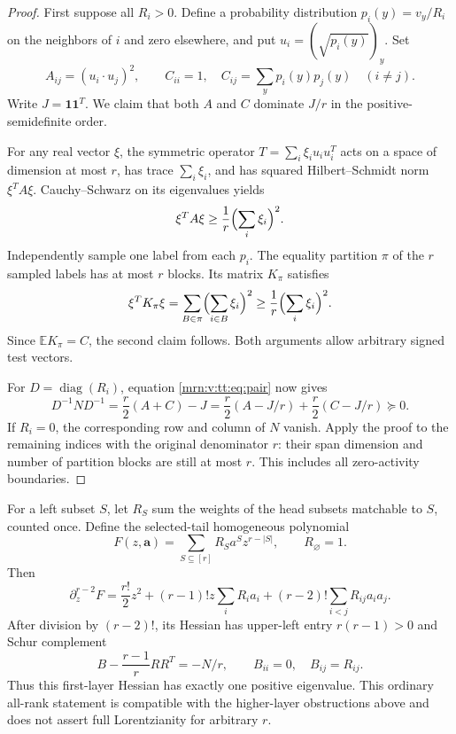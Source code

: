 \documentclass[11pt,a4paper]{article}
\theoremstyle{remark}\newtheorem{remark}[theorem]{Remark}
\newcommand{\diag}{\operatorname{diag}}    %
\begin{document}
\begin{proof}
First suppose all $R_i>0$. Define a probability distribution $p_i(y)=v_y/R_i$ on the neighbors of $i$ and zero elsewhere, and put $u_i=(\sqrt{p_i(y)})_y$. Set
\[
 A_{ij}=(u_i\cdot u_j)^2,\qquad
 C_{ii}=1,\quad C_{ij}=\sum_y p_i(y)p_j(y)\quad(i\ne j).
\]
Write $J=\mathbf1\mathbf1^T$. We claim that both $A$ and $C$ dominate $J/r$ in the positive-semidefinite order.

For any real vector $\xi$, the symmetric operator $T=\sum_i\xi_i u_i u_i^T$ acts on a space of dimension at most $r$, has trace $\sum_i\xi_i$, and has squared Hilbert--Schmidt norm $\xi^TA\xi$. Cauchy--Schwarz on its eigenvalues yields
\[
 \xi^TA\xi\ge\frac1r\Bigl(\sum_i\xi_i\Bigr)^2.
\]
Independently sample one label from each $p_i$. The equality partition $\pi$ of the $r$ sampled labels has at most $r$ blocks. Its matrix $K_\pi$ satisfies
\[
 \xi^TK_\pi\xi=\sum_{B\in\pi}\Bigl(\sum_{i\in B}\xi_i\Bigr)^2
       \ge\frac1r\Bigl(\sum_i\xi_i\Bigr)^2.
\]
Since $\mathbb E K_\pi=C$, the second claim follows. Both arguments allow arbitrary signed test vectors.

For $D=\diag(R_i)$, equation \eqref{mrn:v:tt:eq:pair} now gives
\begin{equation}\label{mrn:v:tt:eq:gram}
 D^{-1}ND^{-1}=\frac r2(A+C)-J
 =\frac r2(A-J/r)+\frac r2(C-J/r)\succeq0.
\end{equation}
If $R_i=0$, the corresponding row and column of $N$ vanish. Apply the proof to the remaining indices with the original denominator $r$: their span dimension and number of partition blocks are still at most $r$. This includes all zero-activity boundaries.
\end{proof}

For a left subset $S$, let $R_S$ sum the weights of the head subsets matchable to $S$, counted once. Define the selected-tail homogeneous polynomial
\[
 F(z,\mathbf a)=\sum_{S\subseteq[r]}R_Sa^S z^{r-|S|},\qquad R_\varnothing=1.
\]
Then
\[
 \partial_z^{r-2}F=\frac{r!}{2}z^2+(r-1)!z\sum_iR_ia_i
                +(r-2)!\sum_{i<j}R_{ij}a_ia_j.
\]
After division by $(r-2)!$, its Hessian has upper-left entry $r(r-1)>0$ and Schur complement
\[
 B-\frac{r-1}{r}RR^T=-N/r,\qquad B_{ii}=0,\quad B_{ij}=R_{ij}.
\]
Thus this first-layer Hessian has exactly one positive eigenvalue. This ordinary all-rank statement is compatible with the higher-layer obstructions above and does not assert full Lorentzianity for arbitrary $r$.
\end{document}
